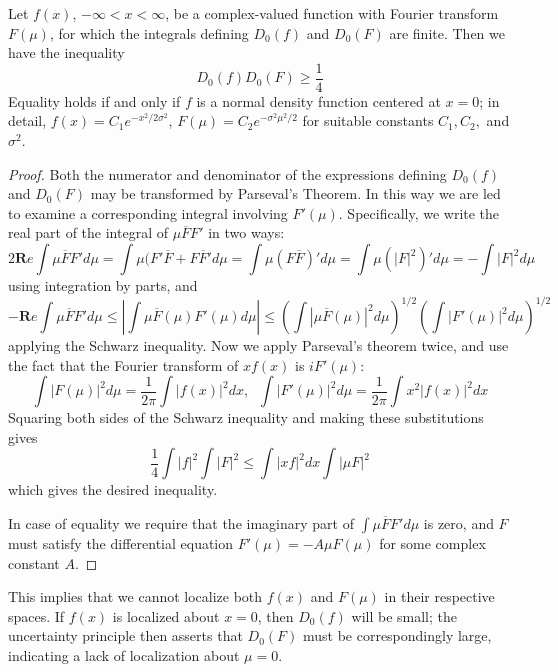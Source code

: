 \documentclass[12pt, a4paper, oneside, openright, titlepage]{book}
\begin{document}
\begin{prop}
    Let $f(x)$, $-\infty < x < \infty$, be a complex-valued function with Fourier transform $F(\mu)$, for which the integrals defining $D_0(f)$ and $D_0(F)$ are finite. Then we have the inequality \begin{equation}
        D_0(f)D_0(F) \geq \frac{1}{4}
    \end{equation}
    Equality holds if and only if $f$ is a normal density function centered at $x = 0$; in detail, $f(x) = C_1e^{-x^2/2\sigma^2}$, $F(\mu) = C_2e^{-\sigma^2\mu^2/2}$ for suitable constants $C_1,C_2,$ and $\sigma^2$.
\end{prop}
\begin{proof}
    Both the numerator and denominator of the expressions defining $D_0(f)$ and $D_0(F)$ may be transformed by Parseval's Theorem. In this way we are led to examine a corresponding integral involving $F'(\mu)$. Specifically, we write the real part of the integral of $\mu\overline{F}F'$ in two ways: \begin{equation*}
        2\mathbf{R}e\int\mu\overline{F}F'd\mu = \int\mu(F'\overline{F}+F\overline{F}'d\mu = \int\mu(F\overline{F})'d\mu = \int\mu(|F|^2)'d\mu = -\int|F|^2d\mu
    \end{equation*}
    using integration by parts, and \begin{equation*}
        -\mathbf{R}e\int\mu\overline{F}F'd\mu \leq \left|\int\mu\overline{F}(\mu)F'(\mu)d\mu\right|\leq \left(\int|\mu\overline{F}(\mu)|^2d\mu\right)^{1/2}\left(\int|F'(\mu)|^2d\mu\right)^{1/2}
    \end{equation*}
    applying the Schwarz inequality. Now we apply Parseval's theorem twice, and use the fact that the Fourier transform of $xf(x)$ is $iF'(\mu)$: \begin{equation*}
        \int|F(\mu)|^2d\mu = \frac{1}{2\pi}\int|f(x)|^2dx,\;\;\int|F'(\mu)|^2d\mu = \frac{1}{2\pi}\int x^2|f(x)|^2dx
    \end{equation*}
    Squaring both sides of the Schwarz inequality and making these substitutions gives $$\frac{1}{4}\int|f|^2\int|F|^2 \leq \int|xf|^2dx\int|\mu F|^2$$ which gives the desired inequality. 

    In case of equality we require that the imaginary part of $\int\mu \overline{F}F'd\mu$ is zero, and $F$ must satisfy the differential equation $F'(\mu) = -A\mu F(\mu)$ for some complex constant $A$.
\end{proof}

This implies that we cannot localize both $f(x)$ and $F(\mu)$ in their respective spaces. If $f(x)$ is localized about $x = 0$, then $D_0(f)$ will be small; the uncertainty principle then asserts that $D_0(F)$ must be correspondingly large, indicating a lack of localization about $\mu = 0$.
\end{document}
